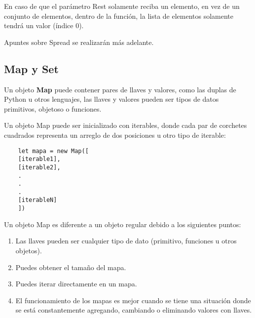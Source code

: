 En caso de que el parámetro Rest solamente reciba un elemento, en vez de un conjunto de elementos, dentro de la función, la lista de elementos solamente tendrá un valor (índice 0).

Apuntes sobre Spread se realizarán más adelante.


\subsection{Map y Set}
\hspace{0.55cm}Un objeto \textbf{Map} puede contener pares de llaves y valores, como las duplas de Python u otros lenguajes, las llaves y valores pueden ser tipos de datos primitivos, objetoso o funciones.

Un objeto Map puede ser inicializado con iterables, donde cada par de corchetes cuadrados representa un arreglo de dos posiciones u otro tipo de iterable:
\begin{lstlisting}
    let mapa = new Map([
    [iterable1],
    [iterable2],
    .
    .
    .
    [iterableN]
    ])
\end{lstlisting}

Un objeto Map es diferente a un objeto regular debido a los siguientes puntos:
\begin{enumerate}
    \item Las llaves pueden ser cualquier tipo de dato (primitivo, funciones u otros objetos).
    \item Puedes obtener el tamaño del mapa.
    \item Puedes iterar directamente en un mapa.
    \item El funcionamiento de los mapas es mejor cuando se tiene una situación donde se está constantemente agregando, cambiando o eliminando valores con llaves.
\end{enumerate}

